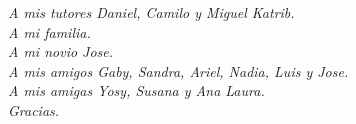 \begin{acknowledgements}
\begin{flushright}
\textit{A mis tutores Daniel, Camilo y Miguel Katrib.\\
A mi familia.\\
A mi novio Jose.\\
A mis amigos Gaby, Sandra, Ariel, Nadia, Luis y Jose.\\
A mis amigas Yosy, Susana y Ana Laura.\\
Gracias.}
\end{flushright}
\end{acknowledgements}